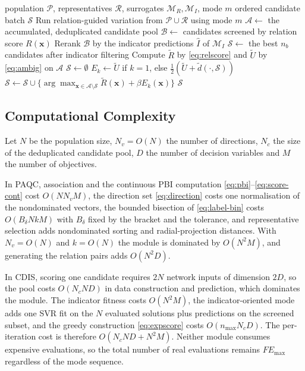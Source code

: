 \documentclass[final,5p,times,twocolumn]{elsarticle}
\newcommand{\vx}{\mathbf{x}}
\begin{document}
\begin{algorithm}[t]
\caption{DiversifiedInfillSelection (CDIS)}
\label{alg:cdis}
\begin{algorithmic}[1]
\Require population $\mathcal{P}$, representatives $\mathcal{R}$, surrogates
         $\mathcal{M}_R,\mathcal{M}_I$, mode $m$
\Ensure ordered candidate batch $\mathcal{S}$
\State Run relation-guided variation from $\mathcal{P}\cup\mathcal{R}$ using mode $m$
\State $\mathcal{A}\gets$ the accumulated, deduplicated candidate pool
  \State $\mathcal{B}\gets$ candidates screened by relation score $R(\vx)$
  \State Rerank $\mathcal{B}$ by the indicator predictions $\widehat I$ of $\mathcal{M}_I$
  \State $\mathcal{S}\gets$ the best $n_b$ candidates after indicator filtering
\Else
  \State Compute $\widetilde R$ by \eqref{eq:relscore} and $\widetilde U$ by \eqref{eq:ambig} on $\mathcal{A}$
  \State $\mathcal{S}\gets\emptyset$
    \State $E_k\gets\widetilde U$ if $k=1$, else
           $\tfrac12(\widetilde U+\widetilde d(\cdot,\mathcal{S}))$ \Comment{\eqref{eq:bonus}}
    \State $\mathcal{S}\gets\mathcal{S}\cup\{\arg\max_{\vx\in\mathcal{A}\setminus\mathcal{S}}
           \widetilde R(\vx)+\beta E_k(\vx)\}$
  \EndFor
\EndIf
\State \Return $\mathcal{S}$
\end{algorithmic}
\end{algorithm}

\subsection{Computational Complexity}
\label{sec:method:complexity}

Let $N$ be the population size, $N_v=O(N)$ the number of directions, $N_c$ the
size of the deduplicated candidate pool, $D$ the number of decision variables
and $M$ the number of objectives.

In PAQC, association and the continuous PBI computation
\eqref{eq:pbi}--\eqref{eq:score-cont} cost $O(NN_vM)$, the direction set
\eqref{eq:direction} costs one normalisation of the nondominated vectors, the
bounded bisection of \eqref{eq:label-bin} costs $O(B_\delta NkM)$ with
$B_\delta$ fixed by the bracket and the tolerance, and representative selection
adds nondominated sorting and radial-projection distances. With $N_v=O(N)$ and
$k=O(N)$ the module is dominated by $O(N^2M)$, and generating the relation pairs
adds $O(N^2D)$.

In CDIS, scoring one candidate requires $2N$ network inputs of
dimension $2D$, so the pool costs $O(N_cND)$ in data construction and
prediction, which dominates the module. The indicator fitness costs $O(N^2M)$,
the indicator-oriented mode adds one SVR fit on the $N$ evaluated solutions plus
predictions on the screened subset, and the greedy construction
\eqref{eq:expscore} costs $O(n_{\max}N_cD)$. The per-iteration cost is therefore $O(N_cND+N^2M)$.
Neither module consumes expensive evaluations, so the total number of real
evaluations remains $FE_{\max}$ regardless of the mode sequence.
\end{document}
